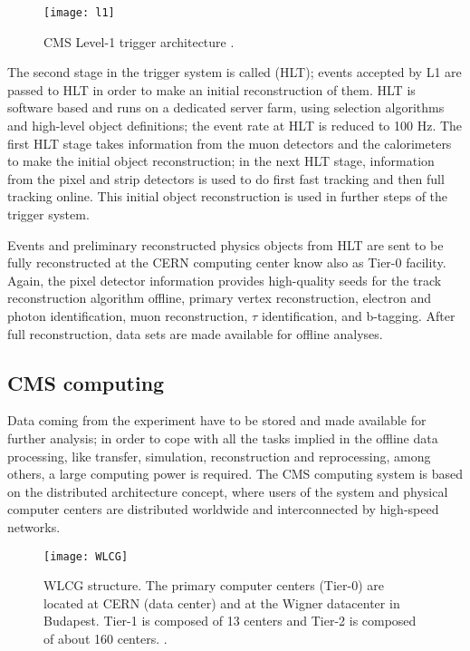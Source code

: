 \begin{figure}[h!]
  \centering
  \texttt{[image: l1]}
  \caption[CMS Level-1 trigger architecture]{CMS Level-1 trigger architecture \cite{l1}. }
  \label{fig:l1}
\end{figure}

The second stage in the trigger system is called  (HLT); events accepted by L1 are passed to HLT in order to make an initial reconstruction of them. HLT is software based and runs on a dedicated server farm, using selection algorithms and high-level object definitions; the event rate at HLT is reduced to 100 Hz. The first HLT stage takes information from the muon detectors and the calorimeters to make the initial object reconstruction; in the next HLT stage, information from the pixel and strip detectors is used to do first fast tracking and then full tracking online. This initial object reconstruction is used in further steps of the trigger system.

Events and preliminary reconstructed physics objects from HLT are sent to be fully reconstructed at the CERN computing center know also as Tier-0 facility. Again, the pixel detector information provides high-quality seeds for the track reconstruction algorithm offline, primary vertex reconstruction, electron and photon identification, muon reconstruction, $\tau$ identification, and b-tagging. After full reconstruction, data sets are made available for offline analyses.


\subsection{CMS computing}

Data coming from the experiment have to be stored and made available for further analysis; in order to cope with all the tasks implied in the offline data processing, like transfer, simulation, reconstruction and reprocessing, among others, a large computing power is required. The CMS computing system is based on the distributed architecture concept, where users of the system and physical computer centers are distributed worldwide and interconnected by high-speed networks.

\begin{figure}[h!]
  \centering
  \texttt{[image: WLCG]}
  \caption[WLCG structure]{WLCG structure. The primary computer centers (Tier-0) are located at CERN (data center) and at the Wigner datacenter in Budapest. Tier-1 is composed of 13 centers and Tier-2 is composed of about 160 centers. \cite{wlcg}. }
  \label{fig:wlcg}
\end{figure}

